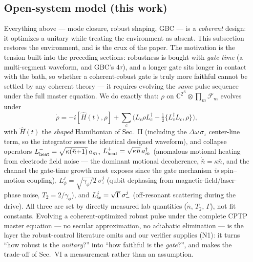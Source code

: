 \documentclass[aps,prapplied,twocolumn,superscriptaddress,floatfix,nofootinbib]{revtex4-2}
\begin{document}
\subsection{Open-system model (this work)}
Everything above --- mode closure, robust shaping, GBC --- is a \emph{coherent} design:
it optimizes a unitary while treating the environment as absent. This subsection restores the
environment, and is the crux of the paper. The motivation is the tension built into the
preceding sections: robustness is bought with \emph{gate time} (a multi-segment waveform, and
GBC's $4\tau$), and a longer gate sits longer in contact with the bath, so whether a
coherent-robust gate is truly more faithful cannot be settled by any coherent theory --- it
requires evolving the \emph{same} pulse sequence under the full master equation. We do exactly
that: $\rho$ on $\mathbb C^{2^N}\!\otimes\!\prod_m\mathcal F_m$ evolves under
\begin{equation}
\dot\rho=-i[\hat H(t),\rho]+\sum_c\big(L_c\rho L_c^\dagger-\tfrac12\{L_c^\dagger L_c,\rho\}\big),
\end{equation}
with $\hat H(t)$ the \emph{shaped} Hamiltonian of Sec.~II (including the $\Delta\omega\,\sigma_z$
center-line term, so the integrator sees the identical designed waveform), and collapse operators
$L_{\rm heat}^{-}=\sqrt{\kappa(\bar n{+}1)}\,a_m$, $L_{\rm heat}^{+}=\sqrt{\kappa\bar n}\,a_m^\dagger$
(anomalous motional heating from electrode field noise --- the dominant motional decoherence,
$\dot{\bar n}=\kappa\bar n$, and the channel the gate-time growth most exposes since the gate
mechanism \emph{is} spin--motion coupling), $L_\phi^{j}=\sqrt{\gamma_\phi/2}\,\sigma_z^{j}$ (qubit
dephasing from magnetic-field/laser-phase noise, $T_2{=}2/\gamma_\phi$), and
$L_{\rm se}^{j}=\sqrt{\Gamma}\,\sigma_-^{j}$ (off-resonant scattering during the drive). All three
are set by directly measured lab quantities ($\dot{\bar n}$, $T_2$, $\Gamma$), not fit constants.
Evolving a coherent-optimized robust pulse under the complete CPTP master equation --- no secular
approximation, no adiabatic elimination --- is the layer the robust-control literature omits and
our verifier supplies (N1): it turns ``how robust is the \emph{unitary}?'' into ``how faithful is
the \emph{gate}?'', and makes the trade-off of Sec.~VI a measurement rather than an assumption.
\end{document}
